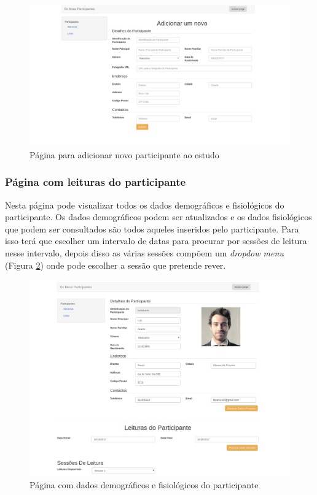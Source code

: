 \begin{figure}[H]
\centering
\includegraphics[width=1\textwidth]{imgs/add_participant_web.png}
\caption[Página para adicionar novo participante ao estudo]{Página para adicionar novo participante ao estudo}
\label{f:web-newparticipante}
\end{figure}
\newpage
\subsubsection{Página com leituras do participante}
Nesta página pode visualizar todos os dados demográficos e fisiológicos do participante. Os dados demográficos podem ser atualizados e os dados fisiológicos que podem ser consultados são todos aqueles inseridos pelo participante. Para isso terá que escolher um intervalo de datas para procurar por sessões de leitura nesse intervalo, depois disso as várias sessões compõem um \textit{dropdow menu} (Figura \ref{f:webleiturassessoes}) onde pode escolher a sessão que pretende rever. 

\begin{figure}[H]
\centering
\includegraphics[width=1\textwidth]{imgs/user-info-web.png}
\caption[Página com dados demográficos e fisiológicos do participante]{Página com dados demográficos e fisiológicos do participante}
\label{f:webleiturassessoes}
\end{figure}

